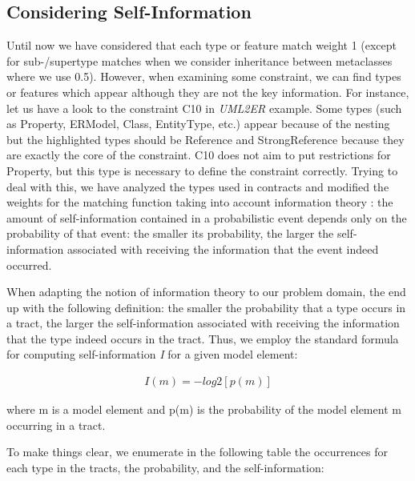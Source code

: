 \subsection{Considering Self-Information}

Until now we have considered that each type or feature match weight 1 (except for sub-/supertype matches when we consider inheritance between metaclasses where we use 0.5). However, when examining some constraint, we can find types or features which appear although they are not the key information. For instance, let us have a look to the constraint C10 in \emph{UML2ER} example. Some types (such as Property, ERModel, Class, EntityType, etc.) appear because of the nesting but the highlighted types should be Reference and StrongReference because they are exactly the core of the constraint. C10 does not aim to put restrictions for Property, but this type is necessary to define the constraint correctly. Trying to deal with this, we have analyzed the types used in contracts and modified the weights for the matching function taking into account information theory \cite{Shannon2001}: the amount of self-information contained in a probabilistic event depends only on the probability of that event: the smaller its probability, the larger the self-information associated with receiving the information that the event indeed occurred.

When adapting the notion of information theory to our problem domain, the end up with the following definition: the smaller the probability that a type occurs in a tract, the larger the self-information associated with receiving the information that the type indeed occurs in the tract. Thus, we employ the standard formula for computing self-information \emph{I} for a given model element:

\begin{align}
I(m) = - log2[p(m)]
\end{align}

where m is a model element and  p(m) is the probability of the model element m occurring in a tract.

To make things clear, we enumerate in the following table the occurrences for each type in the tracts, the probability, and the self-information:

